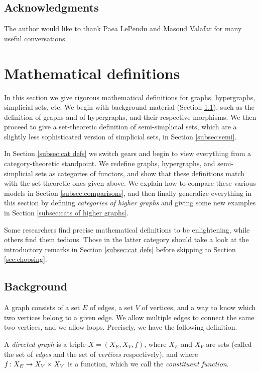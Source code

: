 \documentclass{amsart}
\begin{document}
\subsection{Acknowledgments}

The author would like to thank Paea LePendu and Masoud Valafar for many useful conversations.

\section{Mathematical definitions}\label{sec:math defs}

In this section we give rigorous mathematical definitions for graphs, hypergraphs, simplicial sets, etc.  We begin with background material (Section \ref{subsec:background}), such as the definition of graphs and of hypergraphs, and their respective morphisms.  We then proceed to give a set-theoretic definition of semi-simplicial sets, which are a slightly less sophisticated version of simplicial sets, in Section \ref{subsec:semi}. 

In Section \ref{subsec:cat defs} we switch gears and begin to view everything from a category-theoretic standpoint.  We redefine graphs, hypergraphs, and semi-simplicial sets as categories of functors, and show that these definitions match with the set-theoretic ones given above.  We explain how to compare these various models in Section \ref{subsec:comparisons}, and then finally generalize everything in this section by defining {\em categories of higher graphs} and giving some new examples in Section \ref{subsec:cats of higher graphs}.

Some researchers find precise mathematical definitions to be enlightening, while others find them tedious.  Those in the latter category should take a look at the introductory remarks in Section \ref{subsec:cat defs} before skipping to Section \ref{sec:choosing}.

\subsection{Background}\label{subsec:background}

A graph consists of a set $E$ of edges, a set $V$ of vertices, and a way to know which two vertices belong to a given edge.  We allow multiple edges to connect the same two vertices, and we allow loops.  Precisely, we have the following definition.

\begin{definition}

A {\em directed graph} is a triple $X=(X_E,X_V,f)$, where $X_E$ and $X_V$ are sets (called the set of {\em edges} and the set of {\em vertices} respectively), and where $f\colon X_E\rightarrow X_V\times X_V$ is a function, which we call the {\em constituent function}. 

\end{definition}
\end{document}
